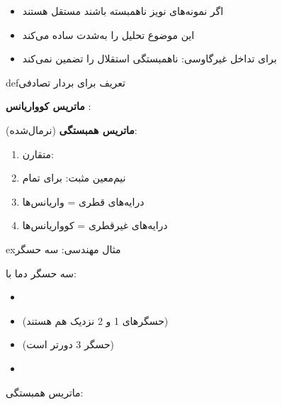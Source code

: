 \begin{itemize}
\tightlist
\item
  اگر نمونه‌های نویز ناهمبسته باشند \lr{\mbox{\ensuremath{\to}}} مستقل هستند
\item
  این موضوع تحلیل را به‌شدت ساده می‌کند
\item
  برای تداخل غیرگاوسی: ناهمبستگی استقلال را تضمین نمی‌کند
\end{itemize}


\begin{PSbox}[unbreakable]{def}{تعریف برای بردار تصادفی }

\textbf{ماتریس کوواریانس} \lr{$\Sigma$}:



\textbf{ماتریس همبستگی}  (نرمال‌شده):


\end{PSbox}


\begin{enumerate}
\def\labelenumi{\arabic{enumi}.}
\tightlist
\item
  متقارن: 
\item
  نیم‌معین مثبت:  برای تمام 
\item
  درایه‌های قطری = واریانس‌ها
\item
  درایه‌های غیرقطری = کوواریانس‌ها
\end{enumerate}

\begin{PSbox}[unbreakable]{ex}{مثال مهندسی: سه حسگر}

سه حسگر دما با:

\begin{itemize}
\tightlist
\item
\item
   (حسگرهای 1 و 2 نزدیک هم هستند)
\item
   (حسگر 3 دورتر است)
\item
\end{itemize}

ماتریس همبستگی:

\end{PSbox}


